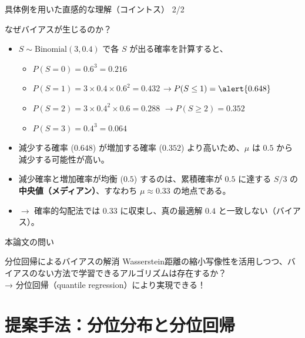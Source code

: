 \documentclass[aspectratio=169, dvipdfmx, 11pt]{beamer}
\begin{document}
\begin{frame}{具体例を用いた直感的な理解（コイントス） 2/2}
  \begin{block}{なぜバイアスが生じるのか？}
    {\small
    \begin{itemize}\setlength{\itemsep}{4pt}
      \item $S \sim \text{Binomial}(3, 0.4)$ で各 $S$ が出る確率を計算すると、
      \begin{itemize}\setlength{\itemsep}{2pt}
        \item $P(S=0) = 0.6^3 = 0.216$
        \item $P(S=1) = 3 \times 0.4 \times 0.6^2 = 0.432$ \quad $\to P(S \le 1) = \alert{0.648}$
        \item $P(S=2) = 3 \times 0.4^2 \times 0.6 = 0.288$ \quad $\to P(S \ge 2) = 0.352$
        \item $P(S=3) = 0.4^3 = 0.064$
      \end{itemize}
      \item 減少する確率 ($0.648$) が増加する確率 ($0.352$) より高いため、$\mu$ は $0.5$ から減少する可能性が高い。
      \item 減少確率と増加確率が均衡 ($0.5$) するのは、累積確率が $0.5$ に達する $S/3$ の\textbf{中央値（メディアン）}、すなわち \alert{$\mu \approx 0.33$} の地点である。
      \item $\to$ 確率的勾配法では $0.33$ に収束し、真の最適解 $0.4$ と\alert{一致しない}（バイアス）。
    \end{itemize}
    }
  \end{block}
\end{frame}

\begin{frame}{本論文の問い}
  \begin{exampleblock}{分位回帰によるバイアスの解消}
    Wasserstein距離の縮小写像性を活用しつつ、\alert{バイアスのない}方法で学習できるアルゴリズムは存在するか？\\
    → \alert{分位回帰}（quantile regression）により実現できる！
  \end{exampleblock}
\end{frame}

\section{提案手法：分位分布と分位回帰}
\end{document}
